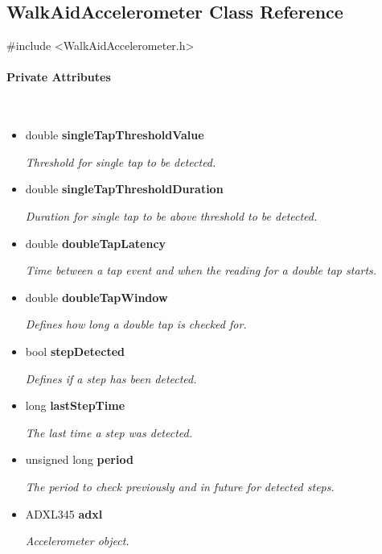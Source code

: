 \subsection{WalkAidAccelerometer Class Reference}
\label{subsec:WalkAidAccelerometer}\mbox{}

    \ttfamily{}

    \#include <WalkAidAccelerometer.h>\\

    \rmfamily{}

    \paragraph{Private Attributes}\mbox{}\\

        \begin{itemize}
            \item double \textbf{singleTapThresholdValue}
            
                \quad \quad \textit{Threshold for single tap to be detected.}

            \item double \textbf{singleTapThresholdDuration}
            
                \quad \quad \textit{Duration for single tap to be above threshold to be detected.}

            \item double \textbf{doubleTapLatency}
            
                \quad \quad \textit{Time between a tap event and when the reading for a double tap starts.}

            \item double \textbf{doubleTapWindow}
            
                \quad \quad \textit{Defines how long a double tap is checked for.}

            \item bool \textbf{stepDetected}
            
                \quad \quad \textit{Defines if a step has been detected.}

            \item long \textbf{lastStepTime}
            
                \quad \quad \textit{The last time a step was detected.}

            \item unsigned long \textbf{period}
            
                \quad \quad \textit{The period to check previously and in future for detected steps.}

            \item ADXL345 \textbf{adxl}
            
                \quad \quad \textit{Accelerometer object.}\\

        \end{itemize}


